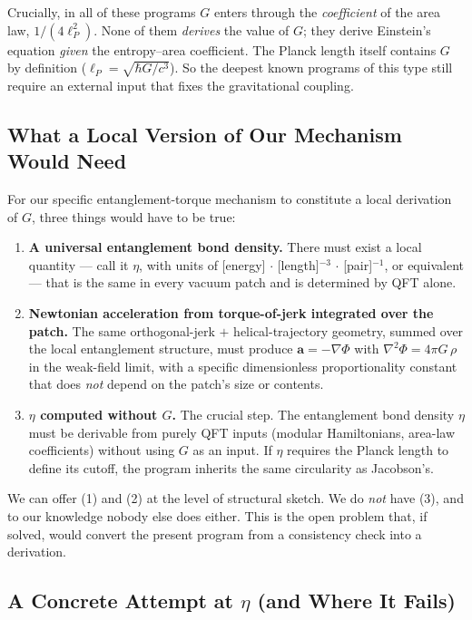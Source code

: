 \documentclass[11pt,letterpaper]{article}
\begin{document}
Crucially, in all of these programs $G$ enters through the
\emph{coefficient} of the area law, $1/(4 \ell_P^2)$. None of them
\emph{derives} the value of $G$; they derive Einstein's equation
\emph{given} the entropy--area coefficient. The Planck length itself
contains $G$ by definition ($\ell_P = \sqrt{\hbar G/c^3}$). So the
deepest known programs of this type still require an external input
that fixes the gravitational coupling.

\subsection{What a Local Version of Our Mechanism Would Need}

For our specific entanglement-torque mechanism to constitute a local
derivation of $G$, three things would have to be true:

\begin{enumerate}
  \item \textbf{A universal entanglement bond density.} There must
    exist a local quantity --- call it $\eta$, with units of
    [energy] $\cdot$ [length]$^{-3}$ $\cdot$ [pair]$^{-1}$, or
    equivalent --- that is the same in every vacuum patch and is
    determined by QFT alone.
  \item \textbf{Newtonian acceleration from torque-of-jerk integrated
    over the patch.} The same orthogonal-jerk $+$ helical-trajectory
    geometry, summed over the local entanglement structure, must
    produce $\mathbf{a} = -\nabla\Phi$ with $\nabla^2 \Phi = 4\pi G\,
    \rho$ in the weak-field limit, with a specific dimensionless
    proportionality constant that does \emph{not} depend on the
    patch's size or contents.
  \item \textbf{$\eta$ computed without $G$.} The crucial step. The
    entanglement bond density $\eta$ must be derivable from purely
    QFT inputs (modular Hamiltonians, area-law coefficients) without
    using $G$ as an input. If $\eta$ requires the Planck length to
    define its cutoff, the program inherits the same circularity as
    Jacobson's.
\end{enumerate}

We can offer (1) and (2) at the level of structural sketch. We do
\emph{not} have (3), and to our knowledge nobody else does either.
This is the open problem that, if solved, would convert the present
program from a consistency check into a derivation.

\subsection{A Concrete Attempt at $\eta$ (and Where It Fails)}
\end{document}
